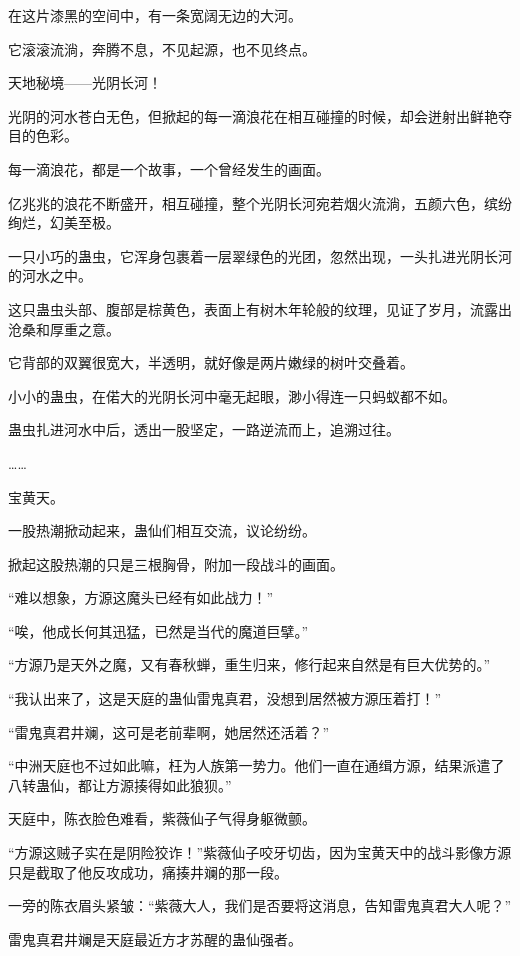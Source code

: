 
\begin{this_body}

在这片漆黑的空间中，有一条宽阔无边的大河。

它滚滚流淌，奔腾不息，不见起源，也不见终点。

天地秘境——光阴长河！

光阴的河水苍白无色，但掀起的每一滴浪花在相互碰撞的时候，却会迸射出鲜艳夺目的色彩。

每一滴浪花，都是一个故事，一个曾经发生的画面。

亿兆兆的浪花不断盛开，相互碰撞，整个光阴长河宛若烟火流淌，五颜六色，缤纷绚烂，幻美至极。

一只小巧的蛊虫，它浑身包裹着一层翠绿色的光团，忽然出现，一头扎进光阴长河的河水之中。

这只蛊虫头部、腹部是棕黄色，表面上有树木年轮般的纹理，见证了岁月，流露出沧桑和厚重之意。

它背部的双翼很宽大，半透明，就好像是两片嫩绿的树叶交叠着。

小小的蛊虫，在偌大的光阴长河中毫无起眼，渺小得连一只蚂蚁都不如。

蛊虫扎进河水中后，透出一股坚定，一路逆流而上，追溯过往。

……

宝黄天。

一股热潮掀动起来，蛊仙们相互交流，议论纷纷。

掀起这股热潮的只是三根胸骨，附加一段战斗的画面。

“难以想象，方源这魔头已经有如此战力！”

“唉，他成长何其迅猛，已然是当代的魔道巨擘。”

“方源乃是天外之魔，又有春秋蝉，重生归来，修行起来自然是有巨大优势的。”

“我认出来了，这是天庭的蛊仙雷鬼真君，没想到居然被方源压着打！”

“雷鬼真君井斓，这可是老前辈啊，她居然还活着？”

“中洲天庭也不过如此嘛，枉为人族第一势力。他们一直在通缉方源，结果派遣了八转蛊仙，都让方源揍得如此狼狈。”

天庭中，陈衣脸色难看，紫薇仙子气得身躯微颤。

“方源这贼子实在是阴险狡诈！”紫薇仙子咬牙切齿，因为宝黄天中的战斗影像方源只是截取了他反攻成功，痛揍井斓的那一段。

一旁的陈衣眉头紧皱：“紫薇大人，我们是否要将这消息，告知雷鬼真君大人呢？”

雷鬼真君井斓是天庭最近方才苏醒的蛊仙强者。


\end{this_body}
